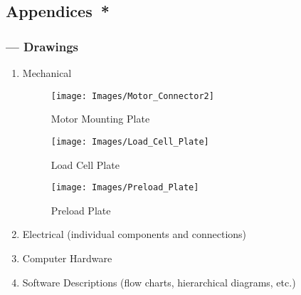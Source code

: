 \documentclass[twocolumn]{article}
\begin{document}







 














\subsection*{Appendices{\color{red}\ *}}
\subsubsection*{ --- Drawings}
\begin{enumerate}
\item{Mechanical}

\begin{figure}[h]
\centering
\texttt{[image: Images/Motor\_Connector2]}
\caption{Motor Mounting Plate}
\label{fig:Motor_Connector2}
\end{figure}

\begin{figure}[h]
\centering
\texttt{[image: Images/Load\_Cell\_Plate]}
\caption{Load Cell Plate}
\label{fig:Load_Cell_Plate}
\end{figure}

\begin{figure}[h]
\centering
\texttt{[image: Images/Preload\_Plate]}
\caption{Preload Plate}
\label{fig:Preload_Plate}
\end{figure}


\item{Electrical (individual components and connections)}
\item{Computer Hardware}
\item{Software Descriptions (flow charts, hierarchical diagrams, etc.)}
\end{enumerate}
\end{document}

